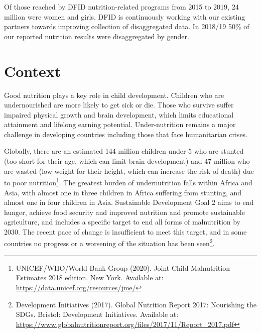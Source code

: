 Of those reached by DFID nutrition-related programs from 2015 to 2019, 24 million were women and girls. %
DFID is continuously working with our existing partners towards improving collection of disaggregated data. %
In 2018/19 50\% of our reported nutrition results were disaggregated by gender. %


\section{Context}

Good nutrition plays a key role in child development. Children who are undernourished are more likely to get sick or die. %
Those who survive suffer impaired physical growth and brain development, which limits educational attainment and lifelong earning potential. %
Under-nutrition remains a major challenge in developing countries including those that face humanitarian crises. %

Globally, there are an estimated 144 million children under 5 who are stunted (too short for their age, which can limit brain development) and 47 million who are wasted (low weight for their height, which can increase the risk of death) due to poor nutrition\footnote{UNICEF/WHO/World Bank Group (2020). Joint Child Malnutrition Estimates 2018 edition. New York. Available at: \href{https://data.unicef.org/resources/jme/}{https://data.unicef.org/resources/jme/}}. %
The greatest burden of undernutrition falls within Africa and Asia, with almost one in three children in Africa suffering from stunting, and almost one in four children in Asia. %
Sustainable Development Goal 2 aims to end hunger, achieve food security and improved nutrition and promote sustainable agriculture, and includes a specific target to end all forms of malnutrition by 2030. %
The recent pace of change is insufficient to meet this target, and in some countries no progress or a worsening of the situation has been seen\footnote{Development Initiatives (2017). Global Nutrition Report 2017: Nourishing the SDGs. Bristol: Development Initiatives. Available at: \href{https://www.globalnutritionreport.org/files/2017/11/Report_2017.pdf}{https://www.globalnutritionreport.org/files/2017/11/Report\_2017.pdf}}. %

